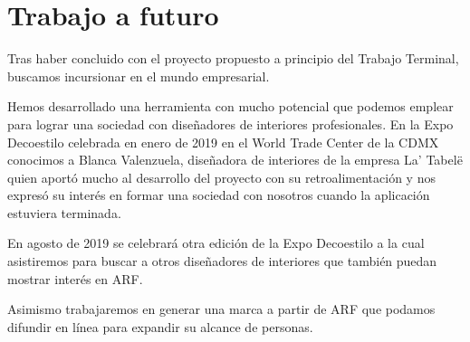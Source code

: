 \chapter{Trabajo a futuro}

Tras haber concluido con el proyecto propuesto a principio del Trabajo Terminal, buscamos incursionar en el mundo empresarial. \par
Hemos desarrollado una herramienta con mucho potencial que podemos emplear para lograr una sociedad con diseñadores de interiores profesionales. En la Expo Decoestilo celebrada en enero de 2019 en el World Trade Center de la CDMX conocimos a Blanca Valenzuela, diseñadora de interiores de la empresa La' Tabelë quien aportó mucho al desarrollo del proyecto con su retroalimentación y nos expresó su interés en formar una sociedad con nosotros cuando la aplicación estuviera terminada.\par
En agosto de 2019 se celebrará otra edición de la Expo Decoestilo a la cual asistiremos para buscar a otros diseñadores de interiores que también puedan mostrar interés en ARF.
\par
Asimismo trabajaremos en generar una marca a partir de ARF que podamos difundir en línea para expandir su alcance de personas.